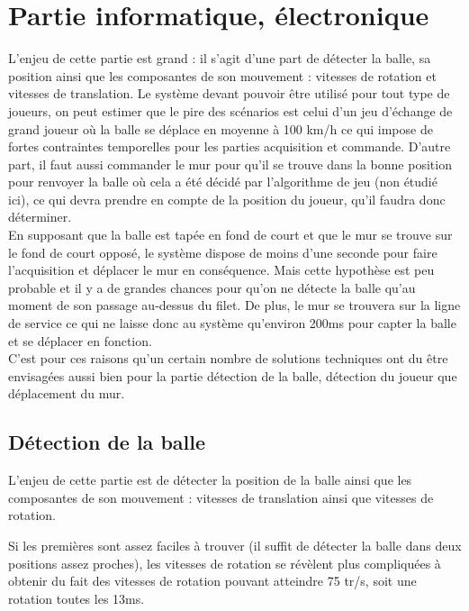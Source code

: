 \part{Partie informatique, électronique}

L'enjeu de cette partie est grand : il s'agit d'une part de détecter la balle, sa position ainsi que les composantes de son mouvement : vitesses de rotation et vitesses de translation. Le système devant pouvoir être utilisé pour tout type de joueurs, on peut estimer que le pire des scénarios est celui d'un jeu d'échange de grand joueur où la balle se déplace en moyenne à 100  km/h ce qui impose de fortes contraintes temporelles pour les parties acquisition et commande. D'autre part, il faut aussi commander le mur pour qu'il se trouve dans la bonne position pour renvoyer la balle où cela a été décidé par l'algorithme de jeu (non étudié ici), ce qui devra prendre en compte de la position du joueur, qu'il faudra donc déterminer.\\

En supposant que la balle est tapée en fond de court et que le mur se trouve sur le fond de court opposé, le système dispose de moins d'une seconde pour faire l'acquisition et déplacer le mur en conséquence. Mais cette hypothèse est peu probable et il y a de grandes chances pour qu'on ne détecte la balle qu'au moment de son passage au-dessus du filet. De plus, le mur se trouvera sur la ligne de service ce qui ne laisse donc au système qu'environ 200ms pour capter la balle et se déplacer en fonction. \\

C'est pour ces raisons qu'un certain nombre de solutions techniques ont du être envisagées aussi bien pour la partie détection de la balle, détection du joueur que déplacement du mur.

\chapter{Détection de la balle}


L'enjeu de cette partie est de détecter la position de la balle ainsi que les composantes de son mouvement : vitesses de translation ainsi que vitesses de rotation. 

Si les premières sont assez faciles à trouver (il suffit de détecter la balle dans deux positions assez proches), les vitesses de rotation se révèlent plus compliquées à obtenir du fait des vitesses de rotation pouvant atteindre 75 tr/s, soit une rotation toutes les 13ms. 


